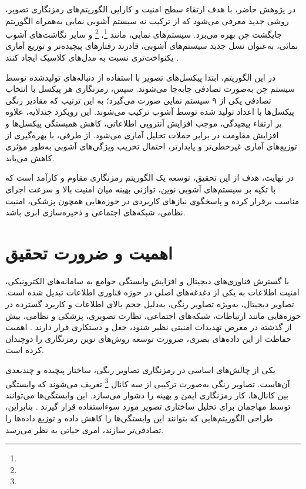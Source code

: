 در پژوهش حاضر، با هدف ارتقاء سطح امنیت و کارایی الگوریتم‌های رمزنگاری تصویر، روشی جدید معرفی می‌شود که از ترکیب نه سیستم آشوبی نمایی به‌همراه الگوریتم جایگشت چن بهره می‌برد. سیستم‌های نمایی، مانند \footnote{}، \footnote{} و سایر نگاشت‌های آشوب نمائی، به‌عنوان نسل جدید سیستم‌های آشوبی، قادرند رفتارهای پیچیده‌تر و توزیع آماری یکنواخت‌تری نسبت به مدل‌های کلاسیک ایجاد کنند \cite{ref4}.

در این الگوریتم، ابتدا پیکسل‌های تصویر با استفاده از دنباله‌های تولیدشده توسط سیستم چن به‌صورت تصادفی جابه‌جا می‌شوند. سپس، رمزنگاری هر پیکسل با انتخاب تصادفی یکی از ۹ سیستم نمایی صورت می‌گیرد؛ به این ترتیب که مقادیر رنگی پیکسل‌ها با اعداد تولید شده توسط آشوب ترکیب می‌شوند. این رویکرد چندلایه، علاوه بر ارتقاء پیچیدگی، موجب افزایش آنتروپی اطلاعاتی، کاهش همبستگی پیکسل‌ها و افزایش مقاومت در برابر حملات تحلیل آماری می‌شود. از طرفی، با بهره‌گیری از توزیع‌های آماری غیرخطی‌تر و پایدارتر، احتمال تخریب ویژگی‌های آشوبی به‌طور مؤثری کاهش می‌یابد.

در نهایت، هدف از این تحقیق، توسعه یک الگوریتم رمزنگاری مقاوم و کارآمد است که با تکیه بر سیستم‌های آشوبی نوین، توازنی بهینه میان امنیت بالا و سرعت اجرای مناسب برقرار کرده و پاسخگوی نیازهای کاربردی در حوزه‌هایی همچون پزشکی، امنیت نظامی، شبکه‌های اجتماعی و ذخیره‌سازی ابری باشد.

\section{اهمیت و ضرورت تحقیق}

با گسترش فناوری‌های دیجیتال و افزایش وابستگی جوامع به سامانه‌های الکترونیکی، امنیت اطلاعات به یکی از دغدغه‌های اصلی در حوزه فناوری اطلاعات تبدیل شده است. تصاویر دیجیتال، به‌ویژه تصاویر رنگی، به‌دلیل حجم بالای اطلاعات و کاربرد گسترده در حوزه‌هایی مانند ارتباطات، شبکه‌های اجتماعی، نظارت تصویری، پزشکی و نظامی، بیش از گذشته در معرض تهدیدات امنیتی نظیر شنود، جعل و دستکاری قرار دارند \cite{ref10}. اهمیت حفاظت از این داده‌های بصری، ضرورت توسعه روش‌های نوین رمزنگاری را دوچندان کرده است.

یکی از چالش‌های اساسی در رمزنگاری تصاویر رنگی، ساختار پیچیده و چندبعدی آن‌هاست. تصاویر رنگی به‌صورت ترکیبی از سه کانال \footnote{} تعریف می‌شوند که وابستگی بین کانال‌ها، کار رمزنگاری ایمن و بهینه را دشوار می‌سازد. این وابستگی‌ها می‌توانند توسط مهاجمان برای تحلیل ساختاری تصویر مورد سوءاستفاده قرار گیرند \cite{ref3}.  بنابراین، طراحی الگوریتم‌هایی که بتوانند این وابستگی‌ها را کاهش داده و توزیع داده‌ها را تصادفی‌تر سازند، امری حیاتی به نظر می‌رسد.

